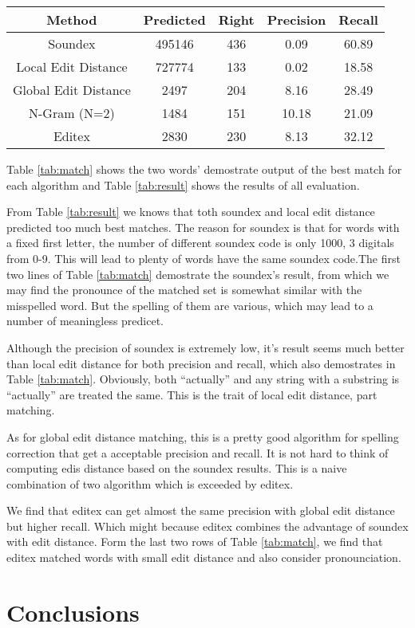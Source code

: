 \documentclass[11pt]{article}
\begin{document}
\begin{table*}
	\centering
	\begin{tabular}{c|c|c|c|c}
		\hline
		Method &Predicted & Right & Precision & Recall \\
		\hline
		Soundex & 495146 & 436 & 0.09 & 60.89 \\
		\hline
		Local Edit Distance  & 727774 & 133 & 0.02 & 18.58 \\
		\hline
		Global Edit Distance  & 2497 & 204 & 8.16 & 28.49 \\
		\hline
		N-Gram (N=2) & 1484 & 151 & 10.18 & 21.09 \\
		\hline
		Editex & 2830 & 230 & 8.13 & 32.12 \\
		\hline
	\end{tabular}
	\caption{All method results}
	\label{tab:result}
\end{table*}

Table \ref{tab:match} shows the two words' demostrate output of the best match for each algorithm  and Table \ref{tab:result} shows the results of all evaluation.

From Table \ref{tab:result} we knows that toth soundex and local edit distance predicted too much best matches. The reason for soundex is that for words with a fixed first letter, the number of different soundex code is only 1000, 3 digitals from 0-9. This will lead to plenty of words have the same soundex code.The first two lines of Table \ref{tab:match} demostrate the soundex's result, from which we may find the pronounce of the matched set is somewhat similar with the misspelled word. But the spelling of them are various, which may lead to a number of meaningless predicet.

Although the precision of soundex is extremely low,  it's result seems much better than local edit distance for both precision and recall, which also demostrates in Table \ref{tab:match}.  Obviously, both ``actually'' and any string with a substring is ``actually'' are treated the same. This is the trait of local edit distance, part matching.

As for global edit distance matching, this is a pretty good algorithm for spelling correction that get a acceptable precision and recall. It is not hard to think of computing edis distance based on the soundex results. This is a naive combination of two algorithm which is exceeded by editex. 

We find that editex can get almost the same precision with global edit distance but higher recall. Which might because editex combines the advantage of soundex with edit distance. Form the last two rows of Table \ref{tab:match}, we find that editex matched words with small edit distance and also consider pronounciation.

\section{Conclusions}





\end{document}
